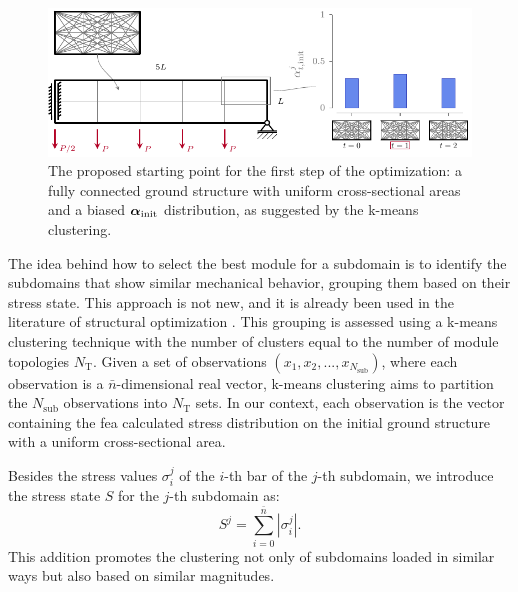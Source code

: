 \begin{figure}
    \centering
    \includegraphics{figures/06_DMO/00_x0/x0.pdf}
    \caption{The proposed starting point for the first step of the optimization: a fully connected ground structure with uniform cross-sectional areas and a biased $\bm{\alpha}_\text{init}$ distribution, as suggested by the k-means clustering.}
    \label{fig:06_x0}
\end{figure}

The idea behind how to select the best module for a subdomain is to identify the subdomains that show similar mechanical behavior, grouping them based on their stress state. This approach is not new, and it is already been used in the literature of structural optimization . This grouping is assessed using a k-means clustering technique with the number of clusters equal to the number of module topologies $N_\text{T}$. Given a set of observations $(x_1, x_2, ..., x_{N_\text{sub}})$, where each observation is a $\bar{n}$-dimensional real vector, k-means clustering aims to partition the $N_\text{sub}$ observations into $N_\text{T}$ sets. In our context, each observation is the vector containing the \acrfull{fea} calculated stress distribution on the initial ground structure with a uniform cross-sectional area.

Besides the stress values $\sigma_i^j$ of the $i$-th bar of the $j$-th subdomain, we introduce the stress state $S$ for the $j$-th subdomain as:
\begin{equation}
    S^j = \sum_{i=0}^{\bar{n}}|\sigma_i^j|.
\end{equation}
This addition promotes the clustering not only of subdomains loaded in similar ways but also based on similar magnitudes. 

